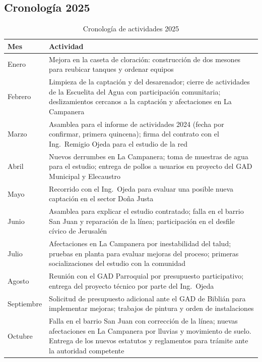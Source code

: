 \subsection*{Cronología 2025}
\begin{table}[H]
\centering
\caption{Cronología de actividades 2025}
\label{tab:cronologia_2025}
\begin{singlespace}
\begin{tabular}{p{3cm} p{11cm}}
\toprule
\textbf{Mes} & \textbf{Actividad} \\
\midrule
Enero & Mejora en la caseta de cloración: construcción de dos mesones para reubicar tanques y ordenar equipos \\
Febrero & Limpieza de la captación y del desarenador; cierre de actividades de la Escuelita del Agua con participación comunitaria; deslizamientos cercanos a la captación y afectaciones en La Campanera \\
Marzo & Asamblea para el informe de actividades 2024 (fecha por confirmar, primera quincena); firma del contrato con el Ing.\ Remigio Ojeda para el estudio de la red \\
Abril & Nuevos derrumbes en La Campanera; toma de muestras de agua para el estudio; entrega de pollos a usuarios en proyecto del GAD Municipal y Elecaustro \\
Mayo & Recorrido con el Ing.\ Ojeda para evaluar una posible nueva captación en el sector Doña Justa \\
Junio & Asamblea para explicar el estudio contratado; falla en el barrio San Juan y reparación de la línea; participación en el desfile cívico de Jerusalén \\
Julio & Afectaciones en La Campanera por inestabilidad del talud; pruebas en planta para evaluar mejoras del proceso; primeras socializaciones del estudio con la comunidad \\
Agosto & Reunión con el GAD Parroquial por presupuesto participativo; entrega del proyecto técnico por parte del Ing.\ Ojeda \\
Septiembre & Solicitud de presupuesto adicional ante el GAD de Biblián para implementar mejoras; trabajos de pintura y orden de instalaciones \\
Octubre & Falla en el barrio San Juan con corrección de la línea; nuevas afectaciones en La Campanera por lluvias y movimiento de suelo. Entrega de los nuevos estatutos y reglamentos para trámite ante la autoridad competente \\
\bottomrule
\end{tabular}
\end{singlespace}
\end{table}

